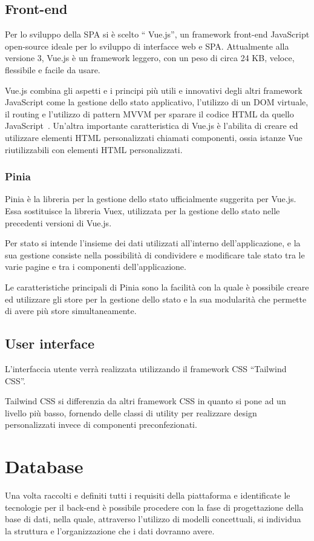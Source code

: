\subsection{Front-end}
Per lo sviluppo della SPA si \`e scelto `` Vue.js'', un framework front-end JavaScript open-source ideale per lo sviluppo di interfacce web e SPA. Attualmente alla versione 3, Vue.js \`e un framework leggero, con un peso di circa 24 KB, veloce, flessibile e facile da usare.

Vue.js combina gli aspetti e i principi pi\`u utili e innovativi degli altri framework JavaScript come la gestione dello stato applicativo, l'utilizzo di un DOM virtuale, il routing e l'utilizzo di pattern MVVM per sparare il codice HTML da quello JavaScript~\cite{HanchettListwon}. Un'altra importante caratteristica di Vue.js \`e l'abilita di creare ed utilizzare elementi HTML personalizzati chiamati componenti, ossia istanze Vue riutilizzabili con elementi HTML personalizzati.
\subsubsection{Pinia}
Pinia \`e la libreria per la gestione dello stato ufficialmente suggerita per Vue.js. Essa sostituisce la libreria Vuex, utilizzata per la gestione dello stato nelle precedenti versioni di Vue.js.

Per stato si intende l'insieme dei dati utilizzati all'interno dell'applicazione, e la sua gestione consiste nella possibilit\`a di condividere e modificare tale stato tra le varie pagine e tra i componenti dell'applicazione.

Le caratteristiche principali di Pinia sono la facilit\`a con la quale \`e possibile creare ed utilizzare gli store per la gestione dello stato e la sua modularit\`a che permette di avere pi\`u store simultaneamente.

\subsection{User interface}
L'interfaccia utente verr\`a realizzata utilizzando il framework CSS ``Tailwind CSS''.

Tailwind CSS si differenzia da altri framework CSS in quanto si pone ad un livello pi\`u basso, fornendo delle classi di utility per realizzare design personalizzati invece di componenti preconfezionati.

\section{Database}
Una volta raccolti e definiti tutti i requisiti della piattaforma e identificate le tecnologie per il back-end \`e possibile procedere con la fase di progettazione della base di dati, nella quale, attraverso l'utilizzo di modelli concettuali, si individua la struttura e l'organizzazione che i dati dovranno avere.

